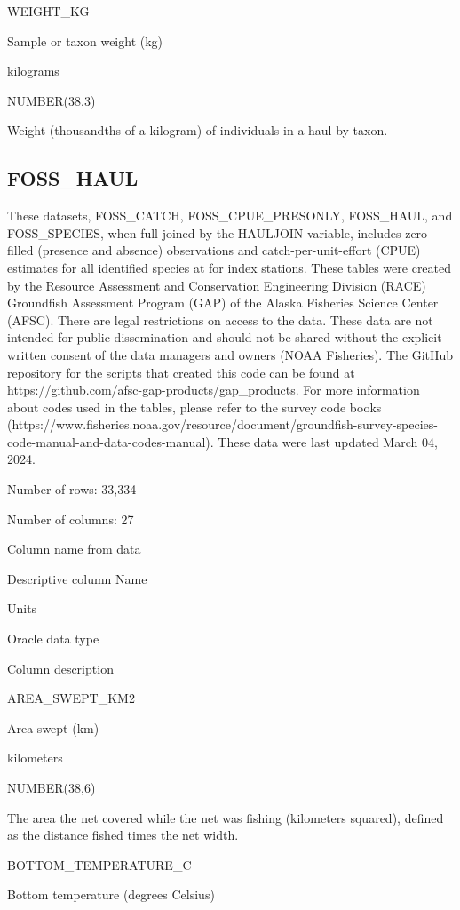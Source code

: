 \documentclass[
  letterpaper,
  oneside,
  open=any]{scrbook}
\begin{document}
WEIGHT\_KG

Sample or taxon weight (kg)

kilograms

NUMBER(38,3)

Weight (thousandths of a kilogram) of individuals in a haul by taxon.

\hypertarget{foss_haul}{%
\subsection{FOSS\_HAUL}\label{foss_haul}}

These datasets, FOSS\_CATCH, FOSS\_CPUE\_PRESONLY, FOSS\_HAUL, and
FOSS\_SPECIES, when full joined by the HAULJOIN variable, includes
zero-filled (presence and absence) observations and
catch-per-unit-effort (CPUE) estimates for all identified species at for
index stations. These tables were created by the Resource Assessment and
Conservation Engineering Division (RACE) Groundfish Assessment Program
(GAP) of the Alaska Fisheries Science Center (AFSC). There are legal
restrictions on access to the data. These data are not intended for
public dissemination and should not be shared without the explicit
written consent of the data managers and owners (NOAA Fisheries). The
GitHub repository for the scripts that created this code can be found at
https://github.com/afsc-gap-products/gap\_products. For more information
about codes used in the tables, please refer to the survey code books
(https://www.fisheries.noaa.gov/resource/document/groundfish-survey-species-code-manual-and-data-codes-manual).
These data were last updated March 04, 2024.

Number of rows: 33,334

Number of columns: 27

Column name from data

Descriptive column Name

Units

Oracle data type

Column description

AREA\_SWEPT\_KM2

Area swept (km)

kilometers

NUMBER(38,6)

The area the net covered while the net was fishing (kilometers squared),
defined as the distance fished times the net width.

BOTTOM\_TEMPERATURE\_C

Bottom temperature (degrees Celsius)
\end{document}
